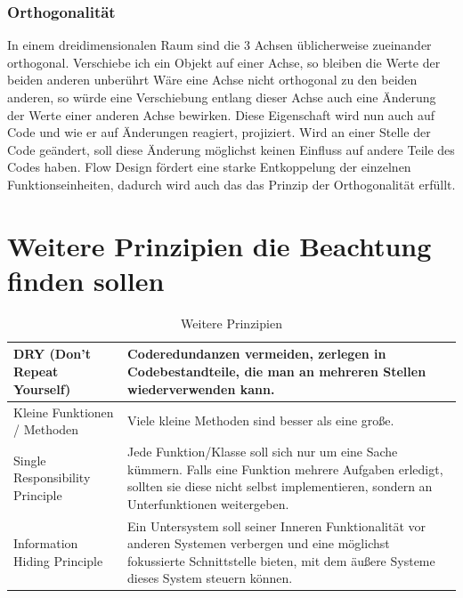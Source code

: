 \subsubsection{Orthogonalität}

In einem dreidimensionalen Raum sind die 3 Achsen üblicherweise zueinander
orthogonal. Verschiebe ich ein Objekt auf einer Achse, so bleiben die Werte der
beiden anderen unberührt Wäre eine Achse nicht orthogonal zu den beiden anderen,
so würde eine Verschiebung entlang dieser Achse auch eine Änderung der Werte
einer anderen Achse bewirken. Diese Eigenschaft wird nun auch auf Code und wie
er auf Änderungen reagiert, projiziert.
Wird an einer Stelle der Code geändert, soll diese Änderung möglichst keinen Einfluss auf
andere Teile des Codes haben. Flow Design fördert eine starke Entkoppelung der
einzelnen Funktionseinheiten, dadurch wird auch das das Prinzip der
Orthogonalität erfüllt.


\section{Weitere Prinzipien die Beachtung finden sollen}

\bigskip
\begin{table}[H]
	\centering
\begin{tabularx}{\textwidth}{| p{160 pt} | X |}
	\hline
DRY  (Don't Repeat Yourself) \cite[S. 80 und S. 342]{Martin2009}  & Coderedundanzen vermeiden, zerlegen in Codebestandteile, die man an mehreren Stellen wiederverwenden kann. \\ \hline
Kleine Funktionen / Methoden {\cite[S. 64]{Martin2009}} & Viele kleine Methoden sind besser als eine große. \\ \hline
Single Responsibility Principle \cite[S. 176 f.]{Martin2009} & Jede Funktion/Klasse soll sich nur um eine Sache kümmern. Falls eine Funktion mehrere 
Aufgaben erledigt, sollten sie diese nicht selbst implementieren, sondern an Unterfunktionen weitergeben. \\ \hline
Information Hiding Principle \cite[S. 48 f.]{schummelzettel}  & Ein Untersystem soll seiner Inneren Funktionalität vor anderen Systemen verbergen und eine möglichst fokussierte Schnittstelle bieten, mit dem äußere Systeme dieses System steuern können.\\ \hline
	\end{tabularx}
	\medskip
	\caption{Weitere Prinzipien}
\end{table}

